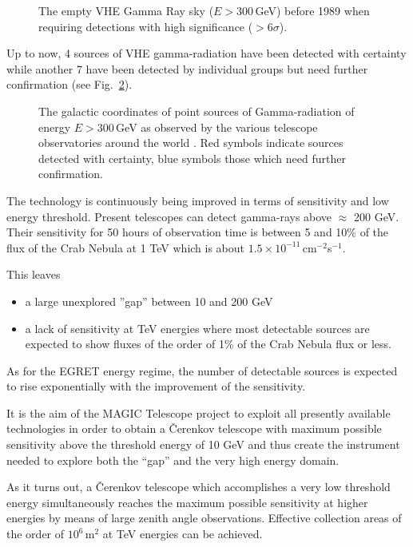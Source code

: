 \begin{figure}[htb] \centering \leavevmode
\epsfxsize=14cm
\caption{\label{fig-empty}
The empty VHE Gamma Ray sky
($ E > 300$\,GeV) before 1989
when requiring detections with high significance ($> 6 \sigma$).}
\end{figure}

Up to now, 4 sources of VHE gamma-radiation have been detected with
certainty while another 7 have been detected by individual groups but need
further confirmation (see Fig.~\ref{fig-vhecat}).

\begin{figure}[htb] \centering \leavevmode
\epsfxsize=14cm
\caption{\label{fig-vhecat}
The galactic coordinates of point sources of Gamma-radiation of energy
$ E > 300$\,GeV as observed by the various \Cherenkov telescope observatories
around the world \cite{petry:97}. Red symbols indicate sources detected with
certainty, blue
symbols those which need further confirmation.}
\end{figure}

The technology is continuously being improved in terms of sensitivity and low
energy threshold. Present telescopes can detect gamma-rays above $\approx$
200 GeV. Their sensitivity for 50 hours of observation time is between 5 and
10\% of the flux of the Crab Nebula at 1 TeV which is about $1.5 \times
10^{-11}$\,cm$^{-2}$s$^{-1}$.

This leaves

\begin{itemize}
\item  a large unexplored ''gap'' between 10 and 200 GeV

\item  a lack of sensitivity at TeV energies where most detectable sources
are expected to show fluxes of the order of 1\% of the Crab Nebula flux or
less.
\end{itemize}

As for the EGRET energy regime, the number of detectable sources is expected
to rise exponentially with the improvement of the sensitivity.

It is the aim of the MAGIC Telescope project to exploit all presently
available technologies in order to obtain a \v{C}erenkov telescope with
maximum possible sensitivity above the threshold energy of 10 GeV and thus
create the instrument needed to explore both the ``gap'' and the very high
energy domain.

As it turns out, a \v{C}erenkov telescope which accomplishes a very low
threshold energy simultaneously reaches the maximum possible sensitivity at
higher energies by means of large zenith angle observations. Effective
collection areas of the order of $10^6$\,m$^2$ at TeV energies can be
achieved.

